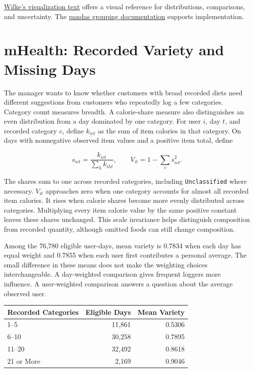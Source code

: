 \noindent \href{https://clauswilke.com/dataviz/}{Wilke's visualization text}
offers a visual reference for distributions, comparisons, and
uncertainty. The
\href{https://pandas.pydata.org/docs/user_guide/groupby.html}{pandas
grouping documentation} supports implementation.

\hypertarget{M02-mhealth-recorded-variety-and-missing-days}{%
\section{mHealth: Recorded Variety and Missing
Days}\label{M02-mhealth-recorded-variety-and-missing-days}}

\noindent The manager wants to know whether customers with broad recorded diets
need different suggestions from customers who repeatedly log a few
categories. Category count measures breadth. A calorie-share measure
also distinguishes an even distribution from a day dominated by one
category. For user \(i\), day \(t\), and recorded category \(c\), define
\(k_{ict}\) as the sum of item calories in that category. On days with
nonnegative observed item values and a positive item total, define

\[
s_{ict}=\frac{k_{ict}}{\sum_h k_{iht}},\qquad
V_{it}=1-\sum_c s_{ict}^2.
\]

The shares sum to one across recorded categories, including
\texttt{Unclassified} where necessary. \(V_{it}\) approaches zero when
one category accounts for almost all recorded item calories. It rises
when calorie shares become more evenly distributed across categories.
Multiplying every item calorie value by the same positive constant
leaves these shares unchanged. This scale invariance helps distinguish
composition from recorded quantity, although omitted foods can still
change composition.

Among the 76,780 eligible user-days, mean variety is 0.7834 when each
day has equal weight and 0.7855 when each user first contributes a
personal average. The small difference in these means does not make the
weighting choices interchangeable. A day-weighted comparison gives
frequent loggers more influence. A user-weighted comparison answers a
question about the average observed user.

\begin{table}[H]
\centering\small
\begin{tabular}{@{}lrr@{}}
\toprule
Recorded Categories & Eligible Days & Mean Variety \\
\midrule

1--5 & 11,861 & 0.5306 \\
6--10 & 30,258 & 0.7895 \\
11--20 & 32,492 & 0.8618 \\
21 or More & 2,169 & 0.9046 \\
\bottomrule
\end{tabular}
\end{table}

